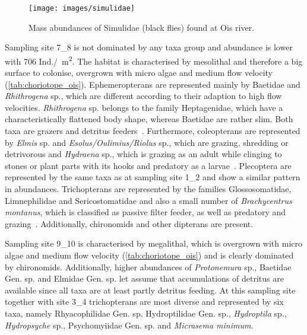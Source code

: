 \begin{figure}[!htb]                            %
  \center
  \texttt{[image: images/simulidae]}              %
  \caption{Mass abundances of Simulidae (black flies) found at Ois river.}            %
  \label{fig:simulidae}                                                        %
\end{figure}

Sampling site 7\_8 is not dominated by any taxa group and abundance is lower with 706 Ind./\SI{}{\square\meter}. The habitat is characterised by mesolithal and therefore a big surface to colonise, overgrown with micro algae and medium flow velocity (\cref{tab:choriotope_ois}). Ephemeropterans are represented mainly by Baetidae and \emph{Rhithrogena} sp., which are different according to their adaption to high flow velocities. \emph{Rhithrogena} sp. belongs to the family Heptagenidae, which have a characteristically flattened body shape, whereas Baetidae are rather slim. Both taxa are grazers and detritus feeders~\parencite{Bauernfeind2002}. Furthermore, coleopterans are represented by \emph{Elmis} sp. and \emph{Esolus/Oulimius/Riolus} sp., which are grazing, shredding or detrivorous and \emph{Hydraena} sp., which is grazing as an adult while clinging to stones or plant parts with its hooks and predatory as a larvae~. Plecoptera are represented by the same taxa as at sampling site 1\_2 and show a similar pattern in abundances. Trichopterans are represented by the families Glossosomatidae, Limnephilidae and Sericostomatidae and also a small number of \emph{Brachycentrus montanus}, which is classified as passive filter feeder, as well as predatory and grazing~. Additionally, chironomids and other dipterans are present.

Sampling site 9\_10 is characterised by megalithal, which is overgrown with micro algae and medium flow velocity (\cref{tab:choriotope_ois}) and is clearly dominated by chironomids. Additionally, higher abundances of \emph{Protonemura} sp., Baetidae Gen. sp. and Elmidae Gen. sp. let assume that accumulations of detritus are available since all taxa are at least partly detritus feeding. At this sampling site together with site 3\_4 trichopterans are most diverse and represented by six taxa, namely Rhyacophilidae Gen. sp, Hydroptilidae Gen. sp., \emph{Hydroptila} sp., \emph{Hydropsyche} sp., Psychomyiidae Gen. sp. and \emph{Micrasema minimum}.

